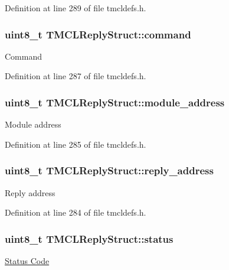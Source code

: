 Definition at line 289 of file tmcldefs.h.\hypertarget{structTMCLReplyStruct_a40395664fbaf18959cc62531d965a790}{
\subsubsection[{command}]{\setlength{\rightskip}{0pt plus 5cm}uint8\_\-t {\bf TMCLReplyStruct::command}}}
\label{structTMCLReplyStruct_a40395664fbaf18959cc62531d965a790}
Command 

Definition at line 287 of file tmcldefs.h.\hypertarget{structTMCLReplyStruct_ae3ebaa97b939afc79eb0efe8c6ba7e4f}{
\subsubsection[{module\_\-address}]{\setlength{\rightskip}{0pt plus 5cm}uint8\_\-t {\bf TMCLReplyStruct::module\_\-address}}}
\label{structTMCLReplyStruct_ae3ebaa97b939afc79eb0efe8c6ba7e4f}
Module address 

Definition at line 285 of file tmcldefs.h.\hypertarget{structTMCLReplyStruct_aa7bdb24d8ec498df4a2d2b067211a344}{
\subsubsection[{reply\_\-address}]{\setlength{\rightskip}{0pt plus 5cm}uint8\_\-t {\bf TMCLReplyStruct::reply\_\-address}}}
\label{structTMCLReplyStruct_aa7bdb24d8ec498df4a2d2b067211a344}
Reply address 

Definition at line 284 of file tmcldefs.h.\hypertarget{structTMCLReplyStruct_a74072ff7b4d9d12df630545839131196}{
\subsubsection[{status}]{\setlength{\rightskip}{0pt plus 5cm}uint8\_\-t {\bf TMCLReplyStruct::status}}}
\label{structTMCLReplyStruct_a74072ff7b4d9d12df630545839131196}
\hyperlink{group__StatusCodes}{Status Code} 

